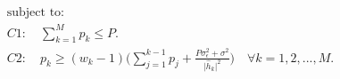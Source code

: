 \documentclass[preview]{standalone}
\begin{document}
\begin{align*}
\text{subject to:}\\ C1:\quad \sum_{k=1}^{M}p_k \leq P.\\ C2:\quad p_k\geq (w_k -1)\big( \sum_{j=1}^{k-1} p_j + \frac{P\sigma_{\epsilon}^2+\sigma^2}{\big|{\hat{h}_k}\big|^2} \big ) \quad \forall k = 1,2,...,M.
\end{align*}
\end{document}
